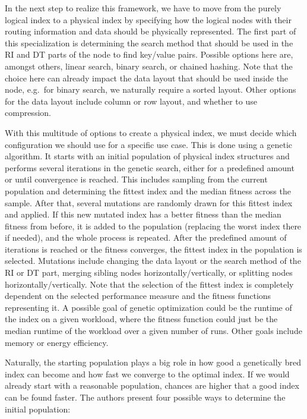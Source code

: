In the next step to realize this framework, we have to move from the purely logical index to a physical index by specifying how the logical nodes with their routing information and data should be physically represented. The first part of this specialization is determining the search method that should be used in the RI and DT parts of the node to find key/value pairs. Possible options here are, amongst others, linear search, binary search, or chained hashing. Note that the choice here can already impact the data layout that should be used inside the node, e.g.~for binary search, we naturally require a sorted layout. Other options for the data layout include column or row layout, and whether to use compression.

With this multitude of options to create a physical index, we must decide which configuration we should use for a specific use case. This is done using a genetic algorithm. It starts with an initial population of physical index structures and performs several iterations in the genetic search, either for a predefined amount or until convergence is reached. This includes sampling from the current population and determining the fittest index and the median fitness across the sample. After that, several mutations are randomly drawn for this fittest index and applied. If this new mutated index has a better fitness than the median fitness from before, it is added to the population (replacing the worst index there if needed), and the whole process is repeated. After the predefined amount of iterations is reached or the fitness converges, the fittest index in the population is selected. Mutations include changing the data layout or the search method of the RI or DT part, merging sibling nodes horizontally/vertically, or splitting nodes horizontally/vertically. Note that the selection of the fittest index is completely dependent on the selected performance measure and the fitness functions representing it. A possible goal of genetic optimization could be the runtime of the index on a given workload, where the fitness function could just be the median runtime of the workload over a given number of runs. Other goals include memory or energy efficiency.

Naturally, the starting population plays a big role in how good a genetically bred index can become and how fast we converge to the optimal index. If we would already start with a reasonable population, chances are higher that a good index can be found faster. The authors present four possible ways to determine the initial population:

